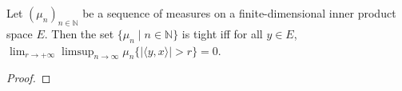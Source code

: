 \begin{lemma}\label{lem:isTightMeasureSet_iff_basis}
\leanok
{}
Let $(\mu_n)_{n \in \mathbb{N}}$ be a sequence of measures on a finite-dimensional inner product space $E$. 
Then the set $\{\mu_n \mid n \in \mathbb{N}\}$ is tight iff for all $y \in E$, $\lim_{r \to +\infty}\limsup_{n \to \infty} \mu_n\{\vert\langle y, x\rangle\vert > r\} = 0$.
\end{lemma}

\begin{proof}\leanok
{}
\end{proof}










